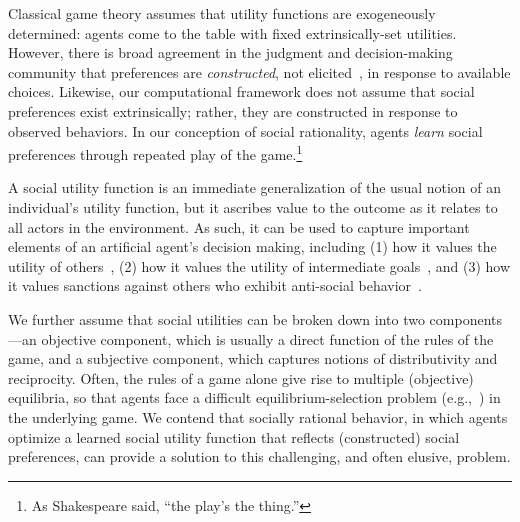 Classical game theory assumes that utility functions are exogeneously
determined: agents come to the table with fixed
extrinsically-set utilities.
However, there is broad agreement in the judgment and decision-making
community that preferences are \emph{constructed}, not
elicited~\cite{Payne_Bettman_Johnson_1993}, in response to available
choices.  Likewise, our computational framework does not assume that
social preferences exist extrinsically; rather, they are constructed
in response to observed behaviors.  In our conception of social
rationality, agents \emph{learn\/} social preferences through repeated
play of the game.\footnote{As Shakespeare said, ``the play's the thing.''}

A social utility function is an immediate generalization of the usual
notion of an individual's utility function, but it ascribes value to
the outcome as it relates to all actors in the environment.
%
%
As such, it can be used to capture important elements of an artificial
agent's decision making, including (1) how it values the utility of
others~\cite{littman01d}, (2) how it values the utility of intermediate goals~\cite{macglashan15b}, and (3)
how it values sanctions against others who exhibit anti-social behavior~\cite{macglashan14c}.

We further assume that social utilities can be broken down into two
components---an objective component, which is usually a direct
function of the rules of the game, and a subjective component, which
captures notions of distributivity and reciprocity.
%
Often, the rules of a game alone give rise to multiple (objective)
equilibria, so that agents face a difficult equilibrium-selection
problem (e.g.,~\cite{schelling1980strategy}) in the underlying game.
%
We contend that socially rational behavior, in which agents optimize a
learned social utility function that reflects (constructed) social
preferences, can provide a solution to this challenging, and often
elusive, problem.


